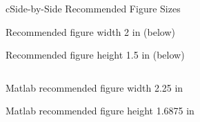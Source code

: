 \begin{myslide}{c}{Side-by-Side Recommended Figure Sizes}

Recommended figure width 2 in (below)

Recommended figure height 1.5 in (below)

\begin{columns}



\end{columns}

\vspace{\baselineskip}

Matlab recommended figure width 2.25 in

Matlab recommended figure height 1.6875 in

\end{myslide}